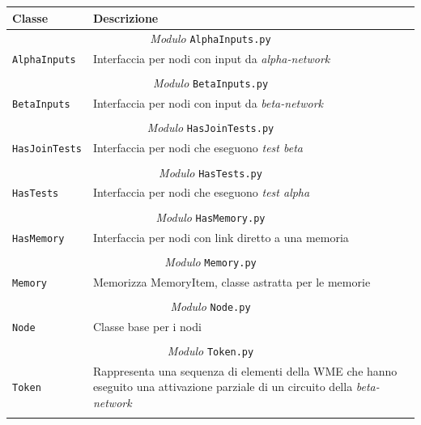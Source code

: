 \begin{longtable}{p{5.5cm}p{6.5cm}}
\hline 
\textbf{Classe} & \textbf{Descrizione} \\ 
\hline\hline 
\endhead

\multicolumn{2}{c}{\emph{Modulo} \texttt{AlphaInputs.py}}\\
	\hdashline[5pt/5pt]
		\texttt{AlphaInputs} & Interfaccia per nodi con input da \emph{alpha-network} \\ 
	\hline\\

\multicolumn{2}{c}{\emph{Modulo} \texttt{BetaInputs.py}}\\
	\hdashline[5pt/5pt]
		\texttt{BetaInputs} & Interfaccia per nodi con input da \emph{beta-network} \\ 
	\hline\\

\multicolumn{2}{c}{\emph{Modulo} \texttt{HasJoinTests.py}}\\
	\hdashline[5pt/5pt]
		\texttt{HasJoinTests} & Interfaccia per nodi che eseguono \emph{test beta} \\ 
	\hline\\

\multicolumn{2}{c}{\emph{Modulo} \texttt{HasTests.py}}\\
	\hdashline[5pt/5pt]
		\texttt{HasTests} & Interfaccia per nodi che eseguono \emph{test alpha} \\ 
	\hline\\

\multicolumn{2}{c}{\emph{Modulo} \texttt{HasMemory.py}}\\
	\hdashline[5pt/5pt]
		\texttt{HasMemory} & Interfaccia per nodi con link diretto a una memoria \\ 
	\hline\\

\multicolumn{2}{c}{\emph{Modulo} \texttt{Memory.py}}\\
	\hdashline[5pt/5pt]
		\texttt{Memory} & Memorizza MemoryItem, classe astratta per le memorie\\ 
	\hline\\

\multicolumn{2}{c}{\emph{Modulo} \texttt{Node.py}}\\
	\hdashline[5pt/5pt]
		\texttt{Node} & Classe base per i nodi \\ 
	\hline\\

\multicolumn{2}{c}{\emph{Modulo} \texttt{Token.py}}\\
	\hdashline[5pt/5pt]
		\texttt{Token} & Rappresenta una sequenza di elementi della WME che hanno eseguito una attivazione parziale di un circuito della \emph{beta-network}\\ 
	\hline\\


\end{longtable}
